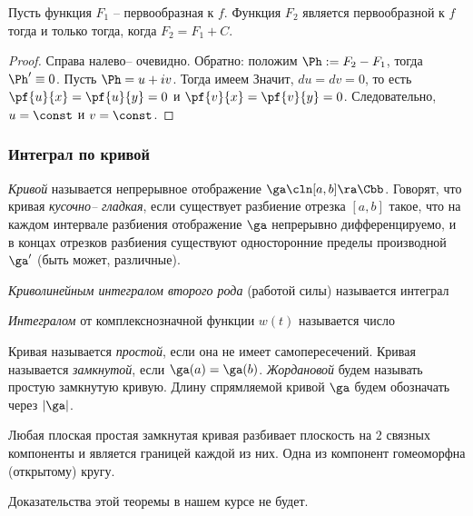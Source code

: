 \documentclass[a4paper]{article}
\begin{document}
\begin{lemma}
Пусть функция $F_1$ -- первообразная к $f$. Функция $F_2$ является первообразной
к $f$ тогда и только тогда, когда $F_2=F_1+C$.
\end{lemma}
\begin{proof}
Справа налево-- очевидно. Обратно: положим $\Ph := F_2-F_1$, тогда $\Ph' \equiv 0$.
Пусть $\Ph = u+iv$. Тогда имеем
Значит, $du = dv=0$, то есть $\pf{u}{x} = \pf{u}{y} =0$ и $\pf{v}{x}=\pf{v}{y}=0$. Следовательно, $u=\const$ и $v=\const$.
\end{proof}

\subsubsection{Интеграл по кривой}

\begin{df}
\emph{Кривой} называется непрерывное отображение $\ga\cln [a,b]\ra \Cbb$.
Говорят, что кривая \emph{кусочно-- гладкая}, если существует разбиение отрезка $[a,b]$ такое, что на каждом
интервале разбиения отображение $\ga$ непрерывно дифференцируемо, и в концах отрезков разбиения
существуют односторонние пределы производной~$\ga'$ (быть может, различные).
\end{df}

\begin{df}
\emph{Криволинейным интегралом второго рода} (работой силы) называется интеграл
\end{df}

\begin{df}
\emph{Интегралом} от комплекснозначной функции $w(t)$ называется число
\end{df}

\begin{df}
Кривая называется \emph{простой}, если она не имеет самопересечений. Кривая называется \emph{замкнутой}, если
$\ga(a)=\ga(b)$. \emph{Жордановой} будем называть простую замкнутую кривую. Длину спрямляемой кривой $\ga$ будем
обозначать через $|\ga|$.
\end{df}

\begin{theorem}[Жордана]
Любая плоская простая замкнутая кривая разбивает плоскость на $2$ связных компоненты и является границей каждой
из них. Одна из компонент гомеоморфна (открытому) кругу.
\end{theorem}
Доказательства этой теоремы в нашем курсе не будет.
\end{document}

